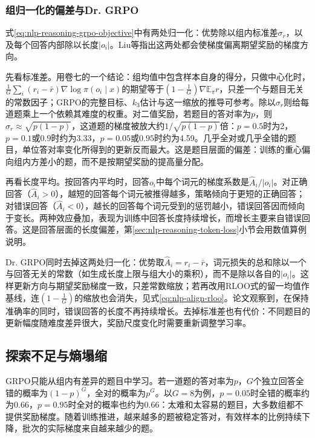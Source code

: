 \subsubsection{组归一化的偏差与Dr. GRPO}
\label{sec:nlp-reasoning-dr-grpo}

式\eqref{eq:nlp-reasoning-grpo-objective}中有两处归一化：优势除以组内标准差$\sigma_r$，以及每个回答内部除以长度$|o_i|$。Liu等指出这两处都会使梯度偏离期望奖励的梯度方向。

先看标准差。用卷七的一个结论：组均值中包含样本自身的得分，只做中心化时，$\frac1G\sum_i(r_i-\bar r)\nabla\log\pi(o_i\mid x)$的期望等于$(1-\frac1G)\nabla\mathbb E_\pi r$，只差一个与题目无关的常数因子；GRPO的完整目标、$k_3$估计与这一缩放的推导可参考。除以$\sigma_r$则给每道题乘上一个依赖其难度的权重。对二值奖励，若题目的答对率为$p$，则$\sigma_r\approx\sqrt{p(1-p)}$，这道题的梯度被放大约$1/\sqrt{p(1-p)}$倍：$p=0.5$时为2，$p=0.1$或$0.9$时约为3.33，$p=0.05$或$0.95$时约为4.59。几乎全对或几乎全错的题目，单位答对率变化所得到的更新反而最大。这是题目层面的偏差：训练的重心偏向组内方差小的题，而不是按期望奖励的提高量分配。

再看长度平均。按回答内平均时，回答$o_i$中每个词元的梯度系数是$\widehat A_i/|o_i|$。对正确回答（$\widehat A_i>0$），越短的回答每个词元被推得越多，策略倾向于更短的正确回答；对错误回答（$\widehat A_i<0$），越长的回答每个词元受到的惩罚越小，错误回答因而倾向于变长。两种效应叠加，表现为训练中回答长度持续增长，而增长主要来自错误回答。这是回答层面的长度偏差，第\ref{sec:nlp-reasoning-token-loss}小节会用数值算例说明。

Dr. GRPO同时去掉这两处归一化：优势取$\widehat A_i=r_i-\bar r$，词元损失的总和除以一个与回答无关的常数（如生成长度上限与组大小的乘积），而不是除以各自的$|o_i|$。这样更新方向与期望奖励梯度一致，只差常数缩放；若再改用RLOO式的留一均值作基线，连$(1-\frac1G)$的缩放也会消失，见式\eqref{eq:nlp-align-rloo}。论文观察到，在保持准确率的同时，错误回答的长度不再持续增长。去掉标准差也有代价：不同题目的更新幅度随难度差异很大，奖励尺度变化时需要重新调整学习率。

\subsection{探索不足与熵塌缩}
\label{sec:nlp-reasoning-exploration}

GRPO只能从组内有差异的题目中学习。若一道题的答对率为$p$，$G$个独立回答全错的概率为$(1-p)^G$，全对的概率为$p^G$。以$G=8$为例，$p=0.05$时全错的概率约为$0.66$，$p=0.95$时全对的概率也约为$0.66$：太难和太容易的题目，大多数组都不提供奖励梯度。随着训练推进，越来越多的题被稳定答对，有效样本的比例持续下降，批次的实际梯度来自越来越少的题。


